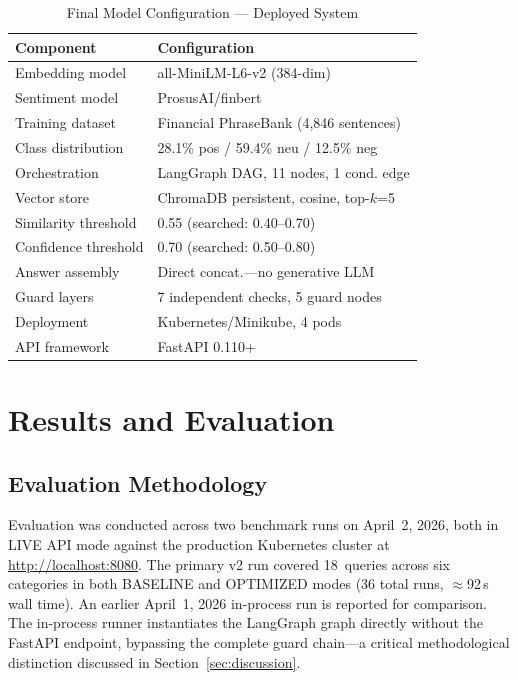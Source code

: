 \documentclass[10pt,journal,compsoc]{IEEEtran}
\begin{document}
\begin{table}[htbp]
\caption{Final Model Configuration --- Deployed System}
\label{tab:config}
\centering
\small
\begin{tabular}{@{}ll@{}}
\toprule
\textbf{Component} & \textbf{Configuration} \\
\midrule
Embedding model      & all-MiniLM-L6-v2 (384-dim) \\
Sentiment model      & ProsusAI/finbert \\
Training dataset     & Financial PhraseBank (4,846 sentences) \\
Class distribution   & 28.1\% pos / 59.4\% neu / 12.5\% neg \\
Orchestration        & LangGraph DAG, 11 nodes, 1 cond. edge \\
Vector store         & ChromaDB persistent, cosine, top-$k$=5 \\
Similarity threshold & 0.55 (searched: 0.40--0.70) \\
Confidence threshold & 0.70 (searched: 0.50--0.80) \\
Answer assembly      & Direct concat.---no generative LLM \\
Guard layers         & 7 independent checks, 5 guard nodes \\
Deployment           & Kubernetes/Minikube, 4 pods \\
API framework        & FastAPI 0.110+ \\
\bottomrule
\end{tabular}
\end{table}

\section{Results and Evaluation}
\label{sec:results}

\subsection{Evaluation Methodology}

Evaluation was conducted across two benchmark runs on April~2, 2026,
both in LIVE API mode against the production Kubernetes cluster at
\url{http://localhost:8080}.
The primary v2 run covered 18~queries across six categories in both
BASELINE and OPTIMIZED modes (36 total runs, $\approx$92\,s wall
time).
An earlier April~1, 2026 in-process run is reported for comparison.
The in-process runner instantiates the LangGraph graph directly without
the FastAPI endpoint, bypassing the complete guard chain---a critical
methodological distinction discussed in Section~\ref{sec:discussion}.
\end{document}
